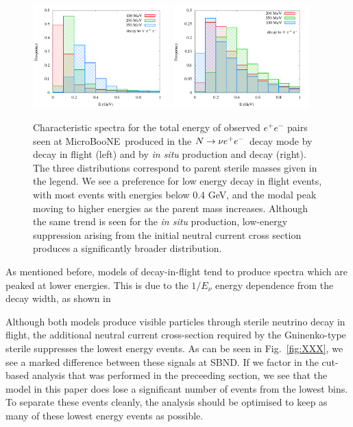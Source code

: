 \documentclass[11pt, a4paper]{article}
\newcommand{\reffig}[1]{Fig.~\ref{#1}}
\def\muboone{MicroBooNE}
\def\ster{\ensuremath N}
\begin{document}
\begin{figure}[t]
%
\center
%
\includegraphics[width=0.47\textwidth]{figures/spectrum_ee_truth.png} \includegraphics[width=0.47\textwidth]{figures/spectrum_ee_situ.png}
%
\caption{\label{fig:spectrum_ee} Characteristic spectra for the total energy of observed  $e^+e^-$ pairs seen at \muboone\ produced in the $\ster \to \nu e^+e^-$ decay mode by decay in flight (left) and by \emph{in situ} production and decay (right). The three distributions correspond to parent sterile masses given in the legend. We see a preference for low energy decay in flight events, with most events with energies below $0.4$ GeV, and the modal peak moving to higher energies as the parent mass increases. Although the same trend is seen for the \emph{in situ} production, low-energy suppression arising from the initial neutral current cross section produces a significantly broader distribution.}
%
\end{figure}



As mentioned before, models of decay-in-flight tend to produce spectra which
are peaked at lower energies. This is due to the $1/E_\nu$ energy dependence
from the decay width, as shown in 

Although both models produce visible particles through sterile neutrino decay
in flight, the additional neutral current cross-section required by the
Gninenko-type sterile suppresses the lowest energy events. As can be seen in
\reffig{fig:XXX}, we see a marked difference between these signals at SBND. If
we factor in the cut-based analysis that was performed in the preceeding
section, we see that the model in this paper does lose a significant number of
events from the lowest bins. To separate these events cleanly, the analysis
should be optimised to keep as many of these lowest energy events as possible. 
\end{document}
